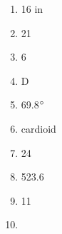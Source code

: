 \documentclass[../uilmath.tex]{subfiles}
\begin{document}
\begin{enumerate}[label=\bfseries\arabic*.]
    \item %
    16 in 

    \item %
    21

    \item %
    6

    \item %
    D 

    \item %
    69.8$\degree$

    \item %
    cardioid 

    \item %
    24

    \item %
    523.6

    \item %
    11

    \item %
    
\end{enumerate}
\end{document}
